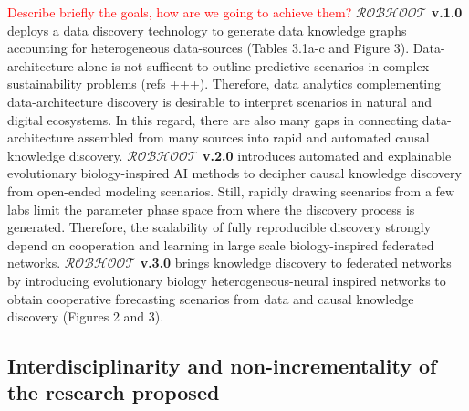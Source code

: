 \documentclass[11pt, a4paper]{article} %
\begin{document}
\textcolor{red}{Describe briefly the goals, how are we going to
  achieve them?} {\bf $\mathcal{ROBHOOT}$ v.1.0} deploys a data
discovery technology to generate data knowledge graphs accounting for
heterogeneous data-sources (Tables 3.1a-c and Figure
3). Data-architecture alone is not sufficent to outline predictive
scenarios in complex sustainability problems (refs +++). Therefore,
data analytics complementing data-architecture discovery is desirable
to interpret scenarios in natural and digital ecosystems. In this
regard, there are also many gaps in connecting data-architecture
assembled from many sources into rapid and automated causal knowledge
discovery. {\bf $\mathcal{ROBHOOT}$ v.2.0} introduces automated and
explainable evolutionary biology-inspired AI methods to decipher
causal knowledge discovery from open-ended modeling scenarios. Still,
rapidly drawing scenarios from a few labs limit the parameter phase
space from where the discovery process is generated. Therefore, the
scalability of fully reproducible discovery strongly depend on
cooperation and learning in large scale biology-inspired federated
networks. {\bf $\mathcal{ROBHOOT}$ v.3.0} brings knowledge discovery
to federated networks by introducing evolutionary biology
heterogeneous-neural inspired networks to obtain cooperative
forecasting scenarios from data and causal knowledge discovery
(Figures 2 and 3).

\subsection{Interdisciplinarity and non-incrementality of the research
  proposed}
\end{document}
